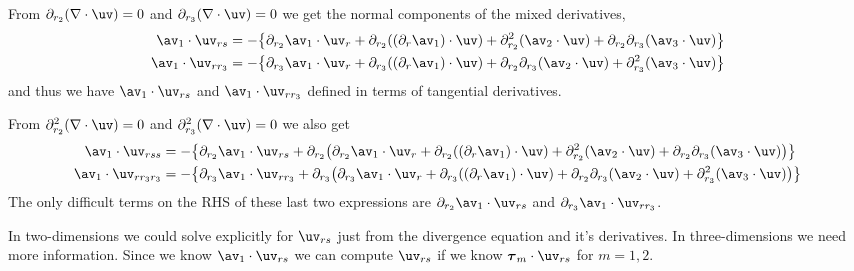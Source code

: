 \documentclass[10pt]{article}
\newcommand{\rc}{{r_3}}%
\newcommand{\grad}{\nabla}
\begin{document}
From $\prb(\grad\cdot\uv)=0$ and $\prc(\grad\cdot\uv)=0$ we get the normal components of the
mixed derivatives,
\begin{align*}
  \av_1\cdot\uv_{rs} &= -\big\{ \prb\av_1\cdot\uv_r + \prb( (\partial_r\av_1)\cdot\uv )
                + \prb^2(\av_2\cdot\uv)+\prb\prc(\av_3\cdot\uv)\big\} \\
  \av_1\cdot\uv_{r\rc} &= -\big\{ \prc\av_1\cdot\uv_r + \prc( (\partial_r\av_1)\cdot\uv )
               + \prb\prc(\av_2\cdot\uv)+\prc^2(\av_3\cdot\uv)\big\} \\
\end{align*}
and thus we have $\av_1\cdot\uv_{rs}$ and $\av_1\cdot\uv_{r\rc}$ defined in terms of tangential derivatives.

From $\prb^2(\grad\cdot\uv)=0$ and $\prc^2(\grad\cdot\uv)=0$ we also get 
\begin{align*}
  \av_1\cdot\uv_{rss} &= -\big\{ \prb\av_1\cdot\uv_{rs} +
            \prb\big( \prb\av_1\cdot\uv_r + \prb( (\partial_r\av_1)\cdot\uv )
                  + \prb^2(\av_2\cdot\uv)+\prb\prc(\av_3\cdot\uv) \big) \big\} \\
  \av_1\cdot\uv_{r\rc\rc} &= -\big\{ \prc\av_1\cdot\uv_{r\rc} +
                \prc\big(  \prc\av_1\cdot\uv_r + \prc( (\partial_r\av_1)\cdot\uv )
                   + \prb\prc(\av_2\cdot\uv)+\prc^2(\av_3\cdot\uv) \big) \big\} \\
\end{align*}
The only difficult terms on the RHS of these
 last two expressions are $\prb\av_1\cdot\uv_{rs}$ and $\prc\av_1\cdot\uv_{r\rc}$.

In two-dimensions we could solve explicitly for $\uv_{rs}$ just from the divergence equation and it's derivatives.
In three-dimensions we need more information. Since we know $\av_1\cdot\uv_{rs}$ we can compute
$\uv_{rs}$ if we know $\tauv_m\cdot\uv_{rs}$ for $m=1,2$.
\end{document}
